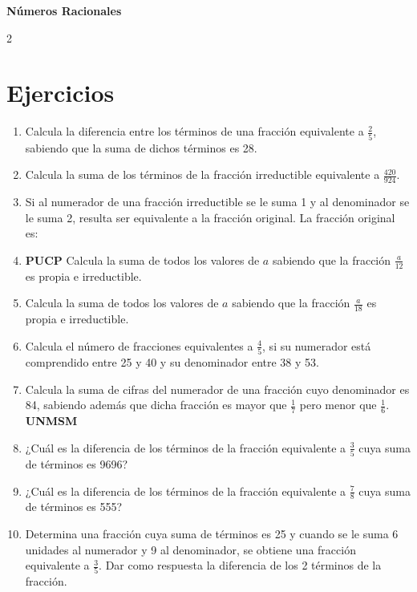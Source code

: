 \documentclass[10pt]{article}
\begin{document}
	\begin{center}
		\Large\bfseries Números Racionales
	\end{center}

\begin{multicols}{2}
	\section*{Ejercicios}
		\begin{enumerate}[label=\textbf{\arabic*.}, itemsep=0.4cm]
			\item Calcula la diferencia entre los términos de una fracción equivalente a \(\frac{2}{5}\), sabiendo que la suma de dichos términos es 28.

			\item Calcula la suma de los términos de la fracción irreductible equivalente a \(\frac{420}{924}\).

			\item Si al numerador de una fracción irreductible se le suma 1 y al denominador se le suma 2, resulta ser equivalente a la fracción original. La fracción original es:

			\item \textbf{PUCP}
			Calcula la suma de todos los valores de \(a\) sabiendo que la fracción \(\frac{a}{12}\) es propia e irreductible.

			\item Calcula la suma de todos los valores de \(a\) sabiendo que la fracción \(\frac{a}{18}\) es propia e irreductible.

			\item Calcula el número de fracciones equivalentes a \(\frac{4}{5}\), si su numerador está comprendido entre 25 y 40 y su denominador entre 38 y 53.

			\item Calcula la suma de cifras del numerador de una fracción cuyo denominador es 84, sabiendo además que dicha fracción es mayor que \(\frac{1}{7}\) pero menor que \(\frac{1}{6}\).
			\textbf{UNMSM}

			\item ¿Cuál es la diferencia de los términos de la fracción equivalente a \(\frac{3}{5}\) cuya suma de términos es 9696?

			\item ¿Cuál es la diferencia de los términos de la fracción equivalente a \(\frac{7}{8}\) cuya suma de términos es 555?

			\item Determina una fracción cuya suma de términos es 25 y cuando se le suma 6 unidades al numerador y 9 al denominador, se obtiene una fracción equivalente a \(\frac{3}{5}\). Dar como respuesta la diferencia de los 2 términos de la fracción.


\end{enumerate}
\end{multicols}
\end{document}
